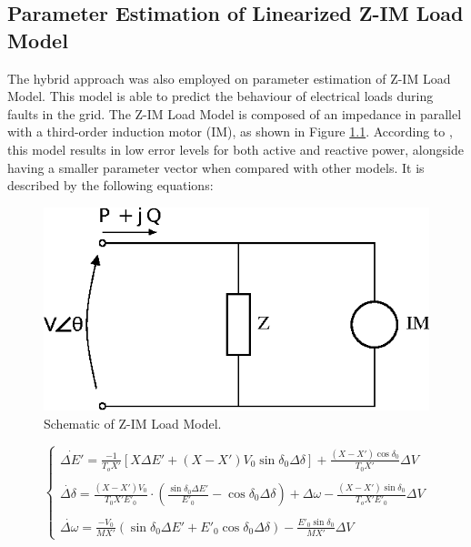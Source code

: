
\begin{apendicesenv}
\partapendices

\chapter{Parameter Estimation of Linearized Z-IM Load Model}

The hybrid approach was also employed on parameter estimation of Z-IM Load Model. This model is able to predict the behaviour of electrical loads during faults in the grid. The Z-IM Load Model is composed of an impedance in parallel with a third-order induction motor (IM), as shown in Figure \ref{img: Z-IM}. According to \cite{Choi}, this model results in low error levels for both active and reactive power, alongside having a smaller parameter vector when compared with other models. It is described by the following equations:

\begin{figure}[h]
    \caption{Schematic of Z-IM Load Model.}
    \begin{center}
    	\includegraphics[scale=1]{Images/drawZIM.eps}
    \end{center}
    \label{img: Z-IM}
\end{figure}

\begin{equation}
    \begin{cases}
        \dot{\Delta E'} = \frac{-1}{T_{o}X'}[X\Delta E' + (X - X')V_{0}\sin\delta_{0}\Delta \delta] + \frac{(X - X')\cos\delta_{0}}{T_{0}X'}\Delta V \\
        \\
        \dot{\Delta \delta} = \frac{(X-X')V_{0}}{T_{0}X'E'_{0}}\cdot\left(\frac{\sin\delta_{0}\Delta E'}{E'_0} - \cos\delta_{0}\Delta\delta\right) + \Delta\omega - \frac{(X - X')\sin\delta_0}{T_o X'E'_0}\Delta V \\
        \\
        \dot{\Delta \omega} = \frac{-V_{0}}{MX'}(\sin\delta_{0}\Delta E' + E'_{0}\cos\delta_{0}\Delta\delta) - \frac{E'_0\sin\delta_0}{MX'}\Delta V
    \end{cases}
    \label{eq: xZIM}
\end{equation}


\end{apendicesenv}
